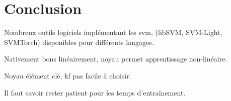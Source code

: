 \section{Conclusion}

Nombreux outils logiciels implémentant les \gls{svm},
(libSVM, SVM-Light, SVMTorch) disponibles pour différents langages.

Nativement bons linéairement, noyau permet apprentissage non-linéaire.

Noyau élément clé, \gls{kf} pas facile à choisir.

Il faut savoir rester patient pour les temps d’entraînement.

\pagebreak

